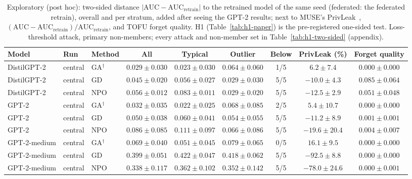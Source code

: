 \begin{table}[t]
\centering
\caption{Exploratory (post hoc): two-sided distance $|\mathrm{AUC}-\mathrm{AUC}_{\mathrm{retrain}}|$ to the retrained model of the same seed (federated: the federated retrain), overall and per stratum, added after seeing the GPT-2 results; next to MUSE's PrivLeak~\cite{shi2024muse}, $(\mathrm{AUC}-\mathrm{AUC}_{\mathrm{retrain}})/\mathrm{AUC}_{\mathrm{retrain}}$, and TOFU forget quality. H1 (Table~\ref{tab:h1-paper}) is the pre-registered one-sided test. Loss-threshold attack, primary non-members; every attack and non-member set in Table~\ref{tab:h1-two-sided} (appendix).}
\label{tab:h1-two-sided-paper}
\footnotesize
\renewcommand{\arraystretch}{1.2}
\setlength{\tabcolsep}{3pt}
\begin{tabular*}{\textwidth}{@{\extracolsep{\fill}}lllcccccc@{}}
\toprule
\textbf{Model} & \textbf{Run} & \textbf{Method} & \textbf{All} & \textbf{Typical} & \textbf{Outlier} & \textbf{Below} & \textbf{PrivLeak (\%)} & \textbf{Forget quality} \\
\midrule
DistilGPT-2 & central & GA$^{\dagger}$ & $0.029 \pm 0.030$ & $0.023 \pm 0.030$ & $0.064 \pm 0.060$ & 1/5 & $6.2 \pm 7.4$ & $0.000 \pm 0.000$ \\
DistilGPT-2 & central & GD & $0.045 \pm 0.020$ & $0.056 \pm 0.027$ & $0.029 \pm 0.030$ & 5/5 & $-10.0 \pm 4.3$ & $0.085 \pm 0.064$ \\
DistilGPT-2 & central & NPO & $0.056 \pm 0.012$ & $0.083 \pm 0.011$ & $0.029 \pm 0.020$ & 5/5 & $-12.5 \pm 2.9$ & $0.051 \pm 0.048$ \\
GPT-2 & central & GA$^{\dagger}$ & $0.032 \pm 0.035$ & $0.022 \pm 0.025$ & $0.068 \pm 0.085$ & 2/5 & $5.4 \pm 10.7$ & $0.000 \pm 0.000$ \\
GPT-2 & central & GD & $0.050 \pm 0.038$ & $0.060 \pm 0.041$ & $0.054 \pm 0.055$ & 5/5 & $-11.2 \pm 8.9$ & $0.001 \pm 0.001$ \\
GPT-2 & central & NPO & $0.086 \pm 0.085$ & $0.111 \pm 0.097$ & $0.066 \pm 0.086$ & 5/5 & $-19.6 \pm 20.4$ & $0.004 \pm 0.007$ \\
GPT-2-medium & central & GA$^{\dagger}$ & $0.069 \pm 0.040$ & $0.051 \pm 0.045$ & $0.079 \pm 0.065$ & 0/5 & $16.1 \pm 9.5$ & $0.000 \pm 0.000$ \\
GPT-2-medium & central & GD & $0.399 \pm 0.051$ & $0.422 \pm 0.047$ & $0.418 \pm 0.062$ & 5/5 & $-92.5 \pm 8.8$ & $0.000 \pm 0.000$ \\
GPT-2-medium & central & NPO & $0.338 \pm 0.117$ & $0.362 \pm 0.102$ & $0.352 \pm 0.142$ & 5/5 & $-78.0 \pm 24.6$ & $0.000 \pm 0.001$ \\

\end{tabular*}
\end{table}
